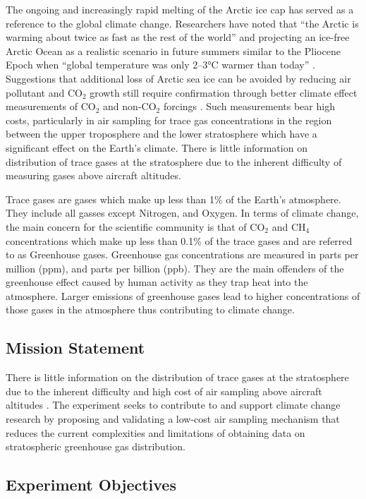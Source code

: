 \documentclass[a4paper,12pt,twoside]{article}
\begin{document}
The ongoing and increasingly rapid melting of the Arctic ice cap has served as a reference to the global climate change. Researchers have noted that \enquote{the Arctic is warming about twice as fast as the rest of the world} \cite{Perkins} and projecting an ice-free Arctic Ocean as a realistic scenario in future summers similar to the Pliocene Epoch when \enquote{global temperature was only 2–3°C warmer than today} \cite{Trace}. Suggestions that additional loss of Arctic sea ice can be avoided by reducing air pollutant and CO$_{2}$ growth still require confirmation through better climate effect measurements of CO$_{2}$ and non-CO$_{2}$ forcings \cite{Trace}. Such measurements bear high costs, particularly in air sampling for trace gas concentrations in the region between the upper troposphere and the lower stratosphere which have a significant effect on the Earth's climate. There is little information on distribution of trace gases at the stratosphere due to the inherent difficulty of measuring gases above aircraft altitudes.

Trace gases are gases which make up less than 1\% of the Earth's atmosphere. They include all gasses except Nitrogen, and Oxygen. In terms of climate change, the main concern for the scientific community is that of CO$_2$ and CH$_4$ concentrations which make up less than 0.1\% of the trace gases and are referred to as Greenhouse gases. Greenhouse gas concentrations are measured in parts per million (ppm), and parts per billion (ppb). They are the main offenders of the greenhouse effect caused by human activity as they trap heat into the atmosphere. Larger emissions of greenhouse gases lead to higher concentrations of those gases in the atmosphere thus contributing to climate change.

\subsection{Mission Statement}

There is little information on the distribution of trace gases at the stratosphere due to the inherent difficulty and high cost of air sampling above aircraft altitudes \cite{Trace}. The experiment seeks to contribute to and support climate change research by proposing and validating a low-cost air sampling mechanism that reduces the current complexities and limitations of obtaining data on stratospheric greenhouse gas distribution.
\pagebreak
\subsection{Experiment Objectives}
\end{document}
